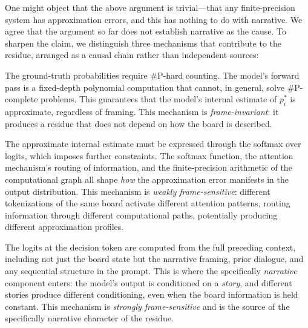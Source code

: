\documentclass[12pt,a4paper]{article}
\theoremstyle{definition}
\theoremstyle{remark}
\begin{document}
One might object that the above argument is trivial---that any
finite-precision system has approximation errors, and this has nothing
to do with narrative.  We agree that the argument so far does not
establish narrative as the cause.  To sharpen the claim, we
distinguish three mechanisms that contribute to the residue, arranged
as a causal chain rather than independent sources:

\begin{description}[leftmargin=2em]
  \item[Mechanism A: Computational intractability.]
    The ground-truth probabilities require \textsc{\#P}-hard counting.
    The model's forward pass is a fixed-depth polynomial computation
    that cannot, in general, solve \textsc{\#P}-complete problems.
    This guarantees that the model's internal estimate of $p_i^*$ is
    approximate, regardless of framing.  This mechanism is
    \emph{frame-invariant}: it produces a residue that does not depend
    on how the board is described.

  \item[Mechanism B: Parameterization constraints.]
    The approximate internal estimate must be expressed through the
    softmax over logits, which imposes further constraints.  The
    softmax function, the attention mechanism's routing of information,
    and the finite-precision arithmetic of the computational graph
    all shape \emph{how} the approximation error manifests in the
    output distribution.  This mechanism is \emph{weakly
    frame-sensitive}: different tokenizations of the same board
    activate different attention patterns, routing information
    through different computational paths, potentially producing
    different approximation profiles.

  \item[Mechanism C: Autoregressive conditioning.]
    The logits at the decision token are computed from the full
    preceding context, including not just the board state but the
    narrative framing, prior dialogue, and any sequential structure
    in the prompt.  This is where the specifically \emph{narrative}
    component enters: the model's output is conditioned on a
    \emph{story}, and different stories produce different conditioning,
    even when the board information is held constant.  This mechanism
    is \emph{strongly frame-sensitive} and is the source of the
    specifically narrative character of the residue.
\end{description}
\end{document}

